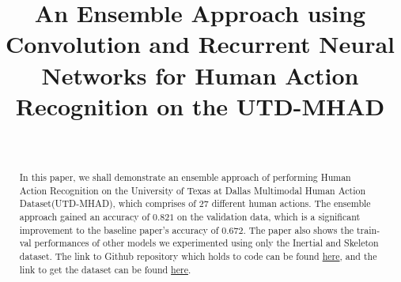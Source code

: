\documentclass[conference]{IEEEtran}
\begin{document}
\title{An Ensemble Approach using Convolution and Recurrent Neural Networks for Human Action Recognition on the UTD-MHAD}

\author{ \\
}
\maketitle

\begin{abstract}
In this paper, we shall demonstrate an ensemble approach of performing Human Action Recognition on the University of Texas at Dallas Multimodal Human Action Dataset(UTD-MHAD), which comprises of $27$ different human actions. The ensemble approach gained an accuracy of $0.821$ on the validation data, which is a significant improvement to the baseline paper's accuracy of $0.672$. The paper also shows the train-val performances of other models we experimented using only the Inertial and Skeleton dataset. The link to Github repository which holds to code can be found \href{https://github.com/notha99y/Multimodal_human_actions}{here}, and the link to get the dataset can be found \href{https://www.utdallas.edu/~kehtar/UTD-MHAD.html}{here}.
\end{abstract}
\end{document}
